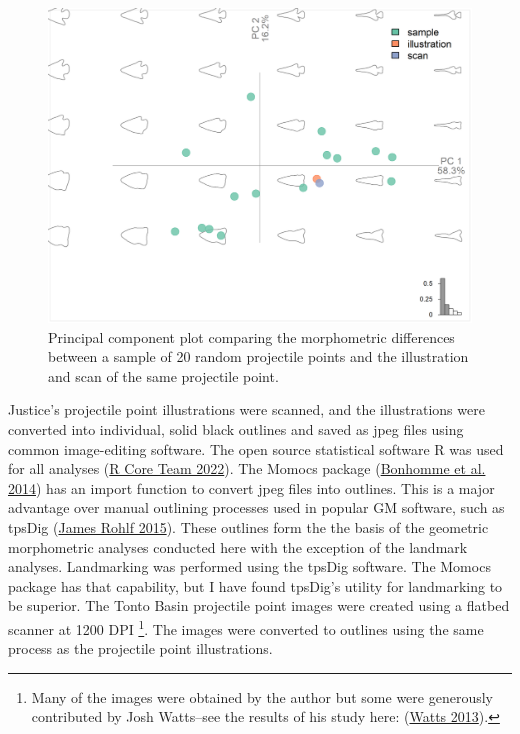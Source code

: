 \documentclass{article}
\begin{document}
\begin{figure}
\includegraphics[width=1\linewidth]{figures/comparisonPCA} \caption{Principal component plot comparing the morphometric differences between a sample of 20 random projectile points and the illustration and scan of the same projectile point.}\label{fig:comparisonPCA}
\end{figure}

Justice's projectile point illustrations were scanned, and the
illustrations were converted into individual, solid black outlines and
saved as jpeg files using common image-editing software. The open source
statistical software R was used for all analyses
(\protect\hyperlink{ref-R_Core_Team2022-wb}{R Core Team 2022}). The
Momocs package (\protect\hyperlink{ref-Bonhomme2014-gt}{Bonhomme et al.
2014}) has an import function to convert jpeg files into outlines. This
is a major advantage over manual outlining processes used in popular GM
software, such as tpsDig
(\protect\hyperlink{ref-James_Rohlf2015-ui}{James Rohlf 2015}). These
outlines form the the basis of the geometric morphometric analyses
conducted here with the exception of the landmark analyses. Landmarking
was performed using the tpsDig software. The Momocs package has that
capability, but I have found tpsDig's utility for landmarking to be
superior. The Tonto Basin projectile point images were created using a
flatbed scanner at 1200 DPI \footnote{Many of the images were obtained
  by the author but some were generously contributed by Josh Watts--see
  the results of his study here:
  (\protect\hyperlink{ref-Watts2013-ub}{Watts 2013}).}. The images were
converted to outlines using the same process as the projectile point
illustrations.
\end{document}
